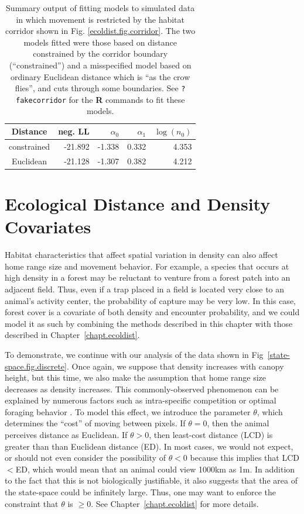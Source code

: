 \begin{table}
\centering
\caption{
Summary output of fitting models to simulated data in which movement
is restricted by the habitat corridor shown in
Fig. \ref{ecoldist.fig.corridor}. The two models fitted were those
based on distance  constrained by the corridor boundary
(``constrained'') and a misspecified model based on ordinary Euclidean
distance which is ``as the crow flies'', and cuts through some
boundaries.
See \mbox{\tt ?fakecorridor} for the {\bf R} commands to fit these
models.
}
\begin{tabular}{c|rrrr} \hline \hline
Distance    &  neg. LL &    $\alpha_0$   & $\alpha_1$    & $\log(n_0)$ \\ \hline
constrained & -21.892 &  -1.338 & 0.332 & 4.353 \\
Euclidean   & -21.128 &  -1.307 & 0.382 & 4.212 \\ \hline
\end{tabular}
\label{rsf.tab.fakecorridor}
\end{table}


\section{Ecological Distance and Density Covariates}

Habitat characteristics that affect spatial variation in density can
also affect home range size and movement behavior. For example, a
species that occurs at high density in a forest may be reluctant to
venture from a forest patch into an adjacent field. Thus, even if a
trap placed in a field is located very close to an animal's activity
center, the probability of capture may be very
low. In this case, forest cover is a covariate of
both density and encounter probability,
and we could model it as such by combining the methods described in
this chapter with those described in Chapter~\ref{chapt.ecoldist}.

To demonstrate, we continue with our analysis of the data shown in
Fig~\ref{state-space.fig.discrete}. Once again, we suppose that density
increases with canopy height, but this time, we also make the
assumption that home range size decreases as density increases. This
commonly-observed phenomenon can be explained by numerous factors such
as intra-specific competition \citep{sillett_etal:2004} or optimal
foraging behavior \citep{tufto_etal:1996,said_servanty:2005}. To model
this effect, we
introduce the parameter $\theta$, which determines the ``cost'' of
moving between pixels. If $\theta=0$, then the animal perceives
distance as Euclidean. If $\theta>0$, then least-cost distance (LCD)
is greater than than Euclidean distance (ED). In most cases, we would
not expect,
or should not even consider the possibility of $\theta<0$ because this
implies that LCD$<$ED, which would mean that an animal could view
1000km as 1m. In addition to the fact that this is not biologically
justifiable, it also suggests that the area of the state-space could
be infinitely large. Thus, one may want to enforce the constraint that
$\theta$ is $\geq 0$. See Chapter~\ref{chapt.ecoldist} for
more details.

